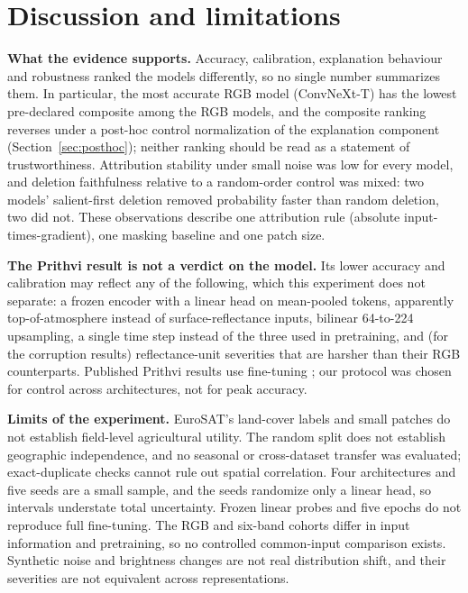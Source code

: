 \documentclass[3p,times,procedia]{elsarticle}
\begin{document}
\section{Discussion and limitations}\label{sec:limitations}
\textbf{What the evidence supports.} Accuracy, calibration, explanation behaviour and robustness ranked the models differently, so no single number summarizes them. In particular, the most accurate RGB model (ConvNeXt-T) has the lowest pre-declared composite among the RGB models, and the composite ranking reverses under a post-hoc control normalization of the explanation component (Section~\ref{sec:posthoc}); neither ranking should be read as a statement of trustworthiness. Attribution stability under small noise was low for every model, and deletion faithfulness relative to a random-order control was mixed: two models' salient-first deletion removed probability faster than random deletion, two did not. These observations describe one attribution rule (absolute input-times-gradient), one masking baseline and one patch size.

\textbf{The Prithvi result is not a verdict on the model.} Its lower accuracy and calibration may reflect any of the following, which this experiment does not separate: a frozen encoder with a linear head on mean-pooled tokens, apparently top-of-atmosphere instead of surface-reflectance inputs, bilinear 64-to-224 upsampling, a single time step instead of the three used in pretraining, and (for the corruption results) reflectance-unit severities that are harsher than their RGB counterparts. Published Prithvi results use fine-tuning \cite{prithvi,prithvicard}; our protocol was chosen for control across architectures, not for peak accuracy.

\textbf{Limits of the experiment.} EuroSAT's land-cover labels and small patches do not establish field-level agricultural utility. The random split does not establish geographic independence, and no seasonal or cross-dataset transfer was evaluated; exact-duplicate checks cannot rule out spatial correlation. Four architectures and five seeds are a small sample, and the seeds randomize only a linear head, so intervals understate total uncertainty. Frozen linear probes and five epochs do not reproduce full fine-tuning. The RGB and six-band cohorts differ in input information and pretraining, so no controlled common-input comparison exists. Synthetic noise and brightness changes are not real distribution shift, and their severities are not equivalent across representations.
\end{document}
